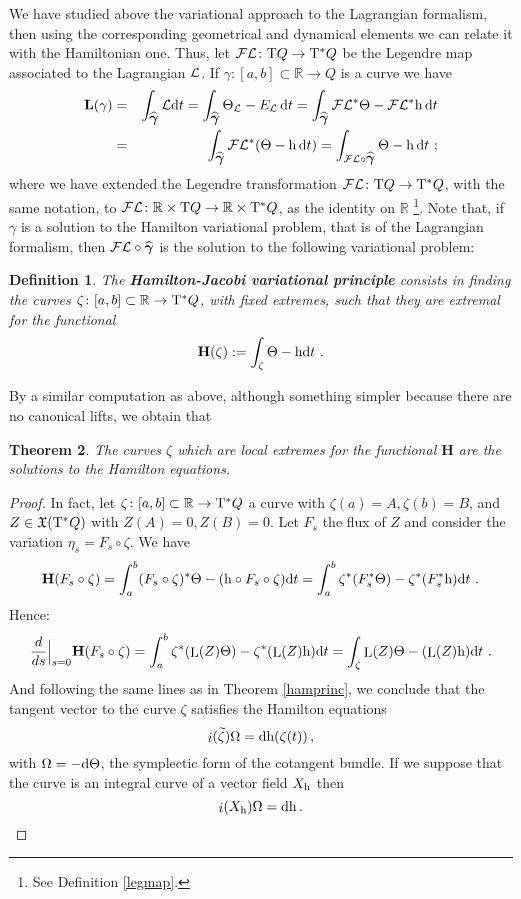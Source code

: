 \documentclass[12pt]{report}
\newtheorem{teor}{Theorem}[chapter]
\newtheorem{definition}[teor]{Definition}
\def\qed{\ifvmode\removelastskip\fi
{\unskip\nobreak\hfil\penalty50\hbox{}\nobreak\hfil
\hbox{\vrule height1.2ex width1.2ex}\parfillskip=0pt
\finalhyphendemerits=0 \par\smallskip}}
\def\vf{\mathfrak X}
\def\Lag{{\cal L}}
\def\d{{\rm d}}
\def\Real{\mathbb{R}}
\def\Tan{{\rm T}}
\def\Lie{\mathop{\rm L}\nolimits}
\def\inn{\mathop{i}\nolimits}
\def\Leg{{\cal F}\Lag}
\begin{document}
We have studied above the variational approach to the Lagrangian formalism, then using the corresponding geometrical and dynamical elements we can relate it with the Hamiltonian one.
Thus, let $\Leg \colon \Tan Q \to \Tan^*Q$ be the Legendre map associated to the Lagrangian $\Lag$.
If $\gamma \colon [a,b]\subset\Real \to Q$ is a curve we have
\begin{eqnarray*}
{\mathbf L}(\gamma ) &=&
\int_{\widehat{\mbox{\boldmath$\gamma$}}}\Lag\d t=
\int_{\widehat{\mbox{\boldmath$\gamma$}}}\Theta_\Lag -E_\Lag\,\d t =
\int_{\widehat{\mbox{\boldmath$\gamma$}}}\Leg^*\Theta -\Leg^*{\rm h}\,\d t 
\\ &=&
\int_{\widehat{\mbox{\boldmath$\gamma$}}}\Leg^*(\Theta -{\rm h}\,\d t) =
\int_{\Leg\circ\widehat{\mbox{\boldmath$\gamma$}}}\Theta - {\rm h}\,\d t \ ;
\end{eqnarray*}
where we have extended the Legendre transformation $\Leg \colon \Tan Q \to \Tan^*Q$, with the same notation, to
$\Leg \colon\Real\times \Tan Q \to \Real\times\Tan^*Q$,
 as the identity on $\Real$
\footnote{
See Definition \ref{legmap}.}.
Note that, if $\gamma$ is a solution to the Hamilton variational problem, that is of the Lagrangian formalism, then 
$\Leg\circ\widehat{\mbox{\boldmath$\gamma$}}$ is the solution to the following variational problem: 

\begin{definition}
The \textbf{Hamilton-Jacobi variational principle} consists in
finding the curves $\zeta \colon [a,b]\subset\Real \to \Tan^*Q$,
with fixed extremes, such that they are extremal for the functional
$$
{\mathbf H}(\zeta ):=\int_\zeta \Theta -{\rm h}\d t \ .
$$
\end{definition}

By a similar computation as above, 
although something simpler because there are no canonical lifts,
we obtain that 

\begin{teor}
The curves $\zeta$ which are local extremes for the functional ${\mathbf H}$
are the solutions to the Hamilton equations.
\end{teor}
\begin{proof}
In fact, let $\zeta\colon [a,b]\subset\Real\to \Tan^*Q$ a curve with 
$\zeta(a)=A,\zeta(b)=B$, and $Z\in\vf(\Tan^{*} Q)$ with $Z(A)=0,Z(B)=0$. 
Let $F_{s}$ the flux of $Z$ and consider the variation $\eta_{s}=F_{s}\circ\zeta$.
We have
$$
{\mathbf H}(F_{s}\circ\zeta)=
\int_a^b(F_{s}\circ\zeta)^*\Theta-({\rm h}\circ F_{s}\circ\zeta)\d t=
\int_a^b\zeta^*(F_{s}^*\Theta)-\zeta^*(F_{s}^*{\rm h})\d t\ .
$$
Hence:
$$
\frac{d}{d s}\Big\vert_{s=0}{\mathbf H}(F_{s}\circ\zeta)=
\int_a^b\zeta^*(\Lie(Z)\Theta)-\zeta^*(\Lie(Z){\rm h})\d t=
\int_\zeta \Lie(Z)\Theta-(\Lie(Z){\rm h})\d t\ .
$$
And following the same lines as in Theorem \ref{hamprinc},
we conclude that the tangent vector to the curve $\zeta$ satisfies the Hamilton equations
$$
\inn(\widetilde\zeta)\Omega=\d {\rm h}(\zeta(t))\, ,
$$
with $\Omega = -\d\Theta$, the symplectic form of the cotangent bundle.
If we suppose that the curve is an integral curve of a vector field $X_{\rm h}$ then
$$
\inn(X_{\rm h})\Omega=\d {\rm h}\, .
$$
\qed\end{proof}
\end{document}

